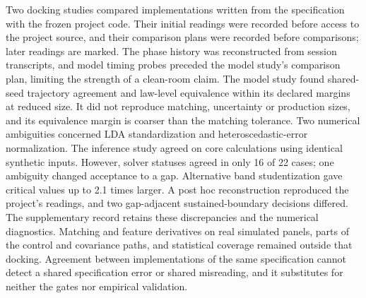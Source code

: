 Two docking studies compared implementations written from the specification with the frozen project code. Their initial readings were recorded before access to the project source, and their comparison plans were recorded before comparisons; later readings are marked. The phase history was reconstructed from session transcripts, and model timing probes preceded the model study's comparison plan, limiting the strength of a clean-room claim. %
The model study found shared-seed trajectory agreement and law-level equivalence within its declared margins at reduced size. It did not reproduce matching, uncertainty or production sizes, and its equivalence margin is coarser than the matching tolerance. Two numerical ambiguities concerned LDA standardization and heteroscedastic-error normalization. %
The inference study agreed on core calculations using identical synthetic inputs. However, solver statuses agreed in only 16 of 22 cases; one ambiguity changed acceptance to a gap. Alternative band studentization gave critical values up to 2.1 times larger. A post hoc reconstruction reproduced the project's readings, and two gap-adjacent sustained-boundary decisions differed. The supplementary record retains these discrepancies and the numerical diagnostics. %
Matching and feature derivatives on real simulated panels, parts of the control and covariance paths, and statistical coverage remained outside that docking. Agreement between implementations of the same specification cannot detect a shared specification error or shared misreading, and it substitutes for neither the gates nor empirical validation. %
